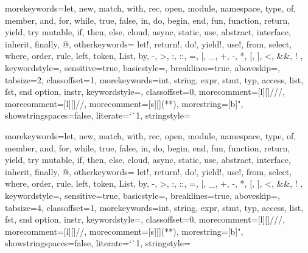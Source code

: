 
%
{morekeywords={let, new, match, with, rec, open, module, namespace, type, of, member, %
and, for, while, true, false, in, do, begin, end, fun, function, return, yield, try %
mutable, if, then, else, cloud, async, static, use, abstract, interface, inherit, finally, @},
  otherkeywords={ let!, return!, do!, yield!, use!, from, select, where, order, rule, left, token, List, by, -, >, :, ::, =, |, _, +, -, *, [, ], <, &&, ! },
  keywordstyle=\color{bluekeywords},
  sensitive=true,
  basicstyle=\ttfamily\footnotesize,
	breaklines=true,
  aboveskip=\bigskipamount,
	tabsize=2,
    classoffset=1,
    morekeywords={int, string, expr, stmt, typ, access, list, fst, snd option, instr},
    keywordstyle=\color{cyantypes},
    classoffset=0,
  morecomment=[l][\color{greencomments}]{///},
  morecomment=[l][\color{greencomments}]{//},
  morecomment=[s][\color{greencomments}]{{(*}{*)}},
  morestring=[b]",
  showstringspaces=false,
  literate={`}{\`}1,
  stringstyle=\color{redstrings}
}
\lstset{style=mystyle}

%
{morekeywords={let, new, match, with, rec, open, module, namespace, type, of, member, %
and, for, while, true, false, in, do, begin, end, fun, function, return, yield, try %
mutable, if, then, else, cloud, async, static, use, abstract, interface, inherit, finally, @},
  otherkeywords={ let!, return!, do!, yield!, use!, from, select, where, order, rule, left, token, List, by, -, >, :, ::, =, |, _, +, -, *, [, ], <, &&, ! },
  keywordstyle=\color{bluekeywords},
  sensitive=true,
  basicstyle=\ttfamily\footnotesize,
	breaklines=true,
  aboveskip=\bigskipamount,
	tabsize=4,
    classoffset=1,
    morekeywords={int, string, expr, stmt, typ, access, list, fst, snd option, instr},
    keywordstyle=\color{cyantypes},
    classoffset=0,
  morecomment=[l][\color{greencomments}]{///},
  morecomment=[l][\color{greencomments}]{//},
  morecomment=[s][\color{greencomments}]{{(*}{*)}},
  morestring=[b]",
  showstringspaces=false,
  literate={`}{\`}1,
  stringstyle=\color{redstrings}
}

